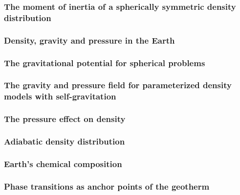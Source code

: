 \documentclass[a4paper]{article}
\begin{document}
\subsubsection{The moment of inertia of a spherically symmetric density distribution} %
\label{sect_scalarmomint}  %
\subsubsection{Density, gravity and pressure in the Earth} %
\label{section_Density-gravity-pressure}  %

\subsubsection{The gravitational potential for spherical problems}
  

\subsubsection{The gravity and pressure field for parameterized density models with self-gravitation}
\label{sect_param_densmod}  %
\subsubsection{The pressure effect on density} %
\label{Pressure_density}  %
\subsubsection{Adiabatic density distribution} %
\label{Adiabatic density distribution}  %
\subsubsection{Earth's chemical composition} %
\label{section-chemical-composition}  %
\subsubsection{Phase transitions as anchor points of the geotherm} %
\label{section-anchor points}  %
\end{document}
